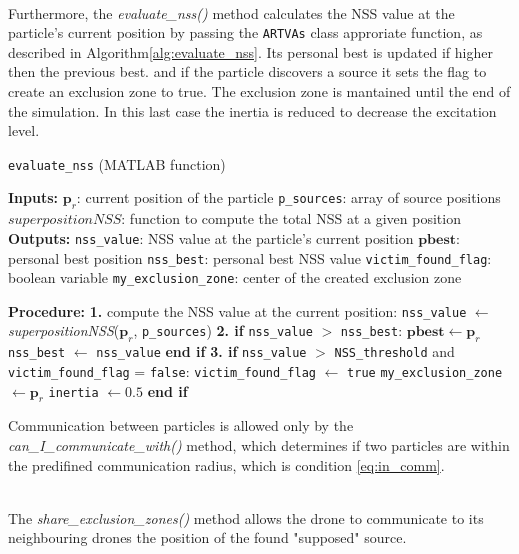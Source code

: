 \noindent\\
Furthermore, the \textit{evaluate\_nss()} method calculates the 
NSS value at the particle's current position by passing the 
\texttt{ARTVAs} class approriate function, as described 
in Algorithm\ref{alg:evaluate_nss}.
Its personal best is updated if higher then the previous best. 
and if the particle discovers a source  
it sets the flag to create an exclusion zone to true.
The exclusion zone is mantained until the end 
of the simulation. 
In this last case the inertia is reduced to decrease 
the excitation level.
\begin{algorithm}[H]
    \caption{\texttt{evaluate\_nss} (MATLAB function)}\label{alg:evaluate_nss}
    \begin{algorithmic}[1]
    \State \textbf{Inputs:}
    \State $\mathbf{p}_r$: current position of the particle
    \State \texttt{p\_sources}: array of source positions
    \State $superpositionNSS$: function to compute the total NSS at a given position
    \State \textbf{Outputs:}
    \State \texttt{nss\_value}: NSS value at the particle's current position
    \State $\mathbf{pbest}$: personal best position
    \State \texttt{nss\_best}: personal best NSS value 
    \State \texttt{victim\_found\_flag}: boolean variable 
    \State \texttt{my\_exclusion\_zone}: center of the created exclusion zone

    \State \textbf{Procedure:}
    \State \quad \textbf{1.} compute the NSS value at the current position:
    \State \quad \texttt{nss\_value} $\gets$ \textit{superpositionNSS}($\mathbf{p}_r$, \texttt{p\_sources})
    \State \textbf{2. if}  \texttt{nss\_value} $>$ \texttt{nss\_best}:
    \State \quad $\mathbf{pbest} \gets \mathbf{p}_r$
    \State \quad \texttt{nss\_best} $\gets$ \texttt{nss\_value}
    \State \quad \textbf{end if}
    \State \textbf{3. if}  \texttt{nss\_value} $>$ \texttt{NSS\_threshold} and \texttt{victim\_found\_flag} = \texttt{false}:
    \State \quad \texttt{victim\_found\_flag} $\gets$ \texttt{true}
    \State \quad \texttt{my\_exclusion\_zone} $\gets \mathbf{p}_r$
    \State \quad \texttt{inertia} $\gets 0.5$
    \State \quad \textbf{end if}
    \end{algorithmic}
\end{algorithm}
\noindent
Communication between particles is allowed only by the 
\textit{can\_I\_communicate\_with()} method, which 
determines if two particles are within the predifined 
communication radius, which is condition \ref{eq:in_comm}.

\noindent\\
The \textit{share\_exclusion\_zones()} 
method allows the drone to communicate to its 
neighbouring drones the position 
of the found "supposed" source.

